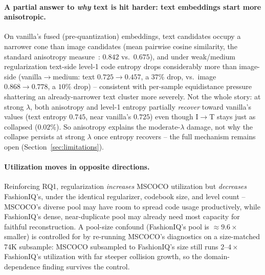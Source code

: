 \paragraph{A partial answer to \emph{why} text is hit harder: text embeddings start more anisotropic.} On vanilla's fused (pre-quantization) embeddings, text candidates occupy a narrower cone than image candidates (mean pairwise cosine similarity, the standard anisotropy measure~\cite{ethayarajh2019anisotropy,gao2019degeneration}: $0.842$ vs.\ $0.675$), and under weak/medium regularization text-side level-1 code entropy drops considerably more than image-side (vanilla$\to$medium: text $0.725\to0.457$, a $37\%$ drop, vs.\ image $0.868\to0.778$, a $10\%$ drop) -- consistent with per-sample equidistance pressure shattering an already-narrower text cluster more severely. Not the whole story: at strong $\lambda$, both anisotropy and level-1 entropy partially \emph{recover} toward vanilla's values (text entropy $0.745$, near vanilla's $0.725$) even though I$\to$T stays just as collapsed ($0.02\%$). So anisotropy explains the moderate-$\lambda$ damage, not why the collapse persists at strong $\lambda$ once entropy recovers -- the full mechanism remains open (Section~\ref{sec:limitations}).

\paragraph{Utilization moves in opposite directions.} Reinforcing RQ1, regularization \emph{increases} MSCOCO utilization but \emph{decreases} FashionIQ's, under the identical regularizer, codebook size, and level count -- MSCOCO's diverse pool may have room to spread code usage productively, while FashionIQ's dense, near-duplicate pool may already need most capacity for faithful reconstruction. A pool-size confound (FashionIQ's pool is $\approx 9.6\times$ smaller) is controlled for by re-running MSCOCO's diagnostics on a size-matched 74K subsample: MSCOCO subsampled to FashionIQ's size still runs $2$--$4\times$ FashionIQ's utilization with far steeper collision growth, so the domain-dependence finding survives the control.
